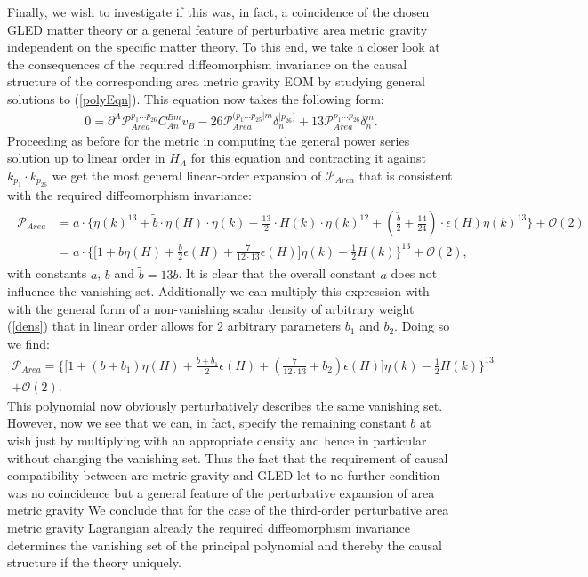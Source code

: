 Finally, we wish to investigate if this was, in fact, a coincidence of the chosen GLED matter theory or a general feature of perturbative area metric gravity independent on the specific matter theory. To this end, we take a closer look at the consequences of the required diffeomorphism invariance on the causal structure of the corresponding area metric gravity EOM by studying general solutions to (\ref{polyEqn}). This equation now takes the following form:
\begin{align}\label{AreaPolyEqn}
    0 = \partial^A \mathcal{P}_{Area}^{p_1...p_{26}} C_{An}^{Bm} v_B - 26\mathcal{P}_{Area}^{(p_1...p_{25}\vert m} \delta_n^{\vert p_{26})} + 13 \mathcal{P}_{Area}^{p_1...p_{26}} \delta^m_n.
\end{align}
Proceeding as before for the metric in computing the general power series solution up to linear order in $H_A$ for this equation and contracting it against $k_{p_1} \cdot k_{p_{26}}$ we get the most general linear-order expansion of $\mathcal{P}_{Area}$ that is consistent with the required diffeomorphism invariance:
\begin{align}
\begin{aligned}
    \mathcal{P}_{Area} &= a \cdot \bigl \{  \eta(k)^{13} + \tilde{b} \cdot \eta(H) \cdot \eta(k) - \frac{13}{2} \cdot  H(k) \cdot \eta(k)^{12} + (\frac{\tilde{b}}{2}+\frac{14}{24}) \cdot \epsilon(H) \eta(k)^{13}  \bigr \} + \mathcal{O}(2)\\
    &=a \cdot \bigl\{  \bigl[ 1 + b \eta(H) + \frac{b}{2} \epsilon(H) +  \frac{7}{12\cdot13} \epsilon(H) \bigr] \eta(k) - \frac{1}{2} H(k)       \bigr\}^{13} + \mathcal{O}(2),
\end{aligned}
\end{align}
with constants $a$, $b$ and $\tilde{b} = 13b$. It is clear that the overall constant $a$ does not influence the vanishing set. Additionally we can multiply this expression with with the general form of a non-vanishing scalar density of arbitrary weight (\ref{dens}) that in linear order allows for $2$ arbitrary parameters $b_1$ and $b_2$. Doing so we find:
\begin{multline}
    \tilde{\mathcal{P}}_{Area} = \bigl\{  \bigl[ 1 + (b+ b_1) \eta(H) + \frac{b+b_1}{2} \epsilon(H) +  (\frac{7}{12\cdot13}+b_2) \epsilon(H) \bigr] \eta(k) - \frac{1}{2} H(k)       \bigr\}^{13} \\
    + \mathcal{O}(2).
\end{multline}
This polynomial now obviously perturbatively describes the same vanishing set. However, now we see that we can, in fact, specify the remaining constant $b$ at wish just by multiplying with an appropriate density and hence in particular without changing the vanishing set. 
Thus the fact that the requirement of causal compatibility between are metric gravity and GLED let to no further condition was no coincidence but a general feature of the perturbative expansion of area metric gravity
We conclude that for the case of the third-order perturbative area metric gravity Lagrangian already the required diffeomorphism invariance determines the vanishing set of the principal polynomial and thereby the causal structure if the theory uniquely. 


